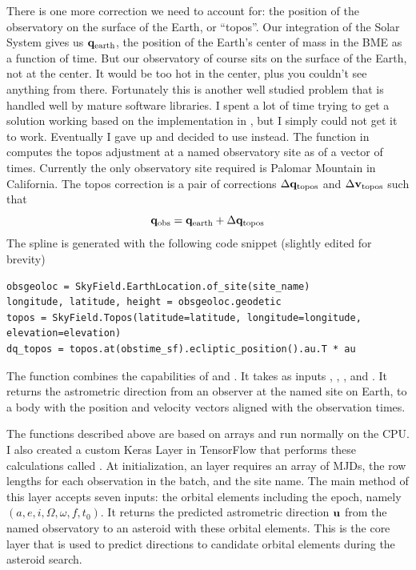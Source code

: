 There is one more correction we need to account for: the position of the observatory on the surface of the Earth, or ``topos''.
Our integration of the Solar System gives us $\mathbf{q}_{\mathrm{earth}}$, the position of the Earth's center of mass in the BME as a function of time.
But our observatory of course sits on the surface of the Earth, not at the center.
It would be too hot in the center, plus you couldn't see anything from there.
Fortunately this is another well studied problem that is handled well by mature software libraries.
I spent a lot of time trying to get a solution working based on the implementation in ,  but I simply could not get it to work.
Eventually I gave up and decided to use  instead.
The function  in  computes the topos adjustment at a named observatory site as of a vector of times.
Currently the only observatory site required is Palomar Mountain in California.
The topos correction is a pair of corrections $\Delta \mathbf{q}_{\mathrm{topos}}$ and $\Delta \mathbf{v}_{\mathrm{topos}}$ such that
$$\mathbf{q}_{\mathrm{obs}} = \mathbf{q}_{\mathrm{earth}} + \Delta \mathbf{q}_{\mathrm{topos}}$$
The spline is generated with the following code snippet (slightly edited for brevity)
\begin{lstlisting}[style=CodeSnippet]
obsgeoloc = SkyField.EarthLocation.of_site(site_name)
longitude, latitude, height = obsgeoloc.geodetic
topos = SkyField.Topos(latitude=latitude, longitude=longitude, elevation=elevation)
dq_topos = topos.at(obstime_sf).ecliptic_position().au.T * au
\end{lstlisting}

The function  combines the capabilities of  and .
It takes as inputs , , ,  and .
It returns the astrometric direction from an observer at the named site on Earth, 
to a body with the position and velocity vectors aligned with the observation times.

The functions described above are based on  arrays and run normally on the CPU.
I also created a custom Keras Layer in TensorFlow that performs these calculations called .
At initialization, an  layer requires an array  of MJDs, the row lengths for each observation in the batch, and the site name.
The main  method of this layer accepts seven inputs: the orbital elements including the epoch, namely
$(a, e, i, \Omega, \omega, f, t_0)$.
It returns the predicted astrometric direction $\mathbf{u}$ from the named observatory to an asteroid with these orbital elements.
This is the core layer that is used to predict directions to candidate orbital elements during the asteroid search.

